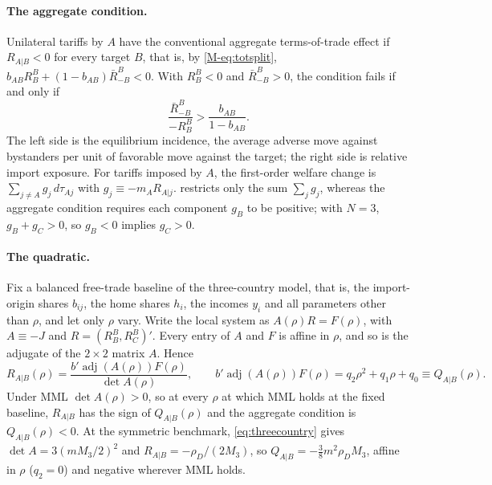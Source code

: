 \documentclass[11pt]{article}
\numberwithin{equation}{section}
\theoremstyle{plain}
\DeclareMathOperator{\adj}{adj}
\begin{document}
\paragraph{The aggregate condition.} Unilateral tariffs by $A$ have the conventional aggregate terms-of-trade effect if $R_{A|B}<0$ for every target $B$, that is, by \cref{M-eq:totsplit}, $b_{AB}R^B_B+(1-b_{AB})\bar R^B_{-B}<0$. With $R^B_B<0$ and $\bar R^B_{-B}>0$, the condition fails if and only if
\begin{equation}
\frac{\bar R^B_{-B}}{-R^B_B}>\frac{b_{AB}}{1-b_{AB}}.
\end{equation}
The left side is the equilibrium incidence, the average adverse move against bystanders per unit of favorable move against the target; the right side is relative import exposure. For tariffs imposed by $A$, the first-order welfare change is $\sum_{j\neq A}g_j\,d\tau_{Aj}$ with $g_j\equiv-m_AR_{A|j}$.  restricts only the sum $\sum_jg_j$, whereas the aggregate condition requires each component $g_B$ to be positive; with $N=3$, $g_B+g_C>0$, so $g_B<0$ implies $g_C>0$.

\paragraph{The quadratic.} Fix a balanced free-trade baseline of the three-country model, that is, the import-origin shares $b_{ij}$, the home shares $h_i$, the incomes $y_i$ and all parameters other than $\rho$, and let only $\rho$ vary. Write the local system as $A(\rho)R=F(\rho)$, with $A\equiv-J$ and $R=(R^B_B,R^B_C)'$. Every entry of $A$ and $F$ is affine in $\rho$, and so is the adjugate of the $2\times2$ matrix $A$. Hence
\begin{equation}
R_{A|B}(\rho)=\frac{b'\adj(A(\rho))F(\rho)}{\det A(\rho)},\qquad
b'\adj(A(\rho))F(\rho)=q_2\rho^2+q_1\rho+q_0\equiv Q_{A|B}(\rho).
\end{equation}
Under MML $\det A(\rho)>0$, so at every $\rho$ at which MML holds at the fixed baseline, $R_{A|B}$ has the sign of $Q_{A|B}(\rho)$ and the aggregate condition is $Q_{A|B}(\rho)<0$. At the symmetric benchmark, \cref{eq:threecountry} gives $\det A=3(mM_3/2)^2$ and $R_{A|B}=-\rho_D/(2M_3)$, so $Q_{A|B}=-\tfrac38m^2\rho_DM_3$, affine in $\rho$ ($q_2=0$) and negative wherever MML holds.
\end{document}
